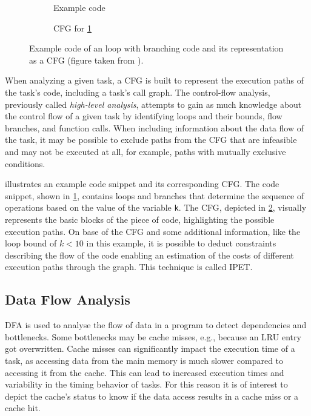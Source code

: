 \begin{figure}[h]
	\begin{subfigure}[c]{0.45\textwidth}
		
		\caption{Example code}
		\label{fig:cfg_code}
	\end{subfigure}
	\hfill
	\begin{subfigure}[c]{0.45\textwidth}
		
		\caption{\ac{CFG} for \cref{fig:cfg_code}}
		\label{fig:cfg}
	\end{subfigure}
	\caption{Example code of an loop with branching code and its representation as a \ac{CFG} (figure taken from \cite{liCacheModelingRealtime1996}).}
	\label{fig:code_and_cfg}
\end{figure}

When analyzing a given task, a \ac{CFG} is built to represent the execution paths of the task's code, including a task's call graph. The control-flow analysis, previously called \textit{high-level analysis}, attempts to gain as much knowledge about the control flow of a given task by identifying loops and their bounds, flow branches, and function calls. When including information about the data flow of the task, it may be possible to exclude paths from the \ac{CFG} that are infeasible and may not be executed at all, for example, paths with mutually exclusive conditions. 

 illustrates an example code snippet and its corresponding \ac{CFG}. 
The code snippet, shown in \cref{fig:cfg_code}, contains loops and branches that determine the sequence of operations based on the value of the variable \texttt{k}. 
The \ac{CFG}, depicted in \cref{fig:cfg}, visually represents the basic blocks of the piece of code, highlighting the possible execution paths.
On base of the \ac{CFG} and some additional information, like the loop bound of $k<10$ in this example, it is possible to deduct constraints describing the flow of the code enabling an estimation of the costs of different execution paths through the graph\cite{liCacheModelingRealtime1996,wilhelmWorstcaseExecutiontimeProblem2008}.
This technique is called \ac{IPET}\cite{wilhelmWorstcaseExecutiontimeProblem2008}.

\subsection{Data Flow Analysis}\label{sec:dfa}
\ac{DFA} is used to analyse the flow of data in a program to detect dependencies and bottlenecks.
Some bottlenecks may be cache misses, e.g., because an \ac{LRU} entry got overwritten. 
Cache misses can significantly impact the execution time of a task, as accessing data from the main memory is much slower compared to accessing it from the cache\cite{liCacheModelingRealtime1996}. 
This can lead to increased execution times and variability in the timing behavior of tasks.
For this reason it is of interest to depict the cache's status to know if the data access results in a cache miss or a cache hit.


